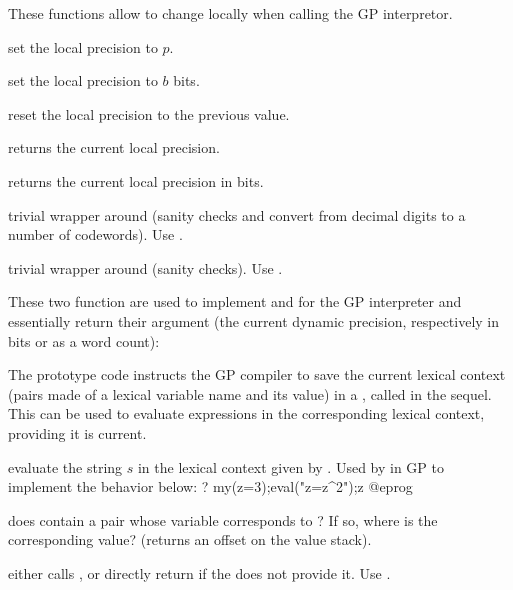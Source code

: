 These functions allow to change  locally when
calling the GP interpretor.

 set the local precision to $p$.

 set the local precision to $b$ bits.

 reset the local precision to the previous
value.

 returns the current local precision.

 returns the current local precision in bits.

 trivial wrapper around 
(sanity checks and convert from decimal digits to a number of codewords).
Use .

 trivial wrapper around 
(sanity checks). Use .

These two function are used to implement  and
 for the GP interpreter and essentially return their
argument (the current dynamic precision, respectively in bits or as a
 word count):





The prototype code  instructs the GP compiler to save the current
lexical context (pairs made of a lexical variable name and its value)
in a , called  in the sequel. This  can be used
to evaluate expressions in the corresponding lexical context, providing it is
current.

 evaluate the string $s$
in the lexical context given by .  Used by  in GP
to implement the behavior below:
\bprog
? my(z=3);eval("z=z^2");z
@eprog

 does  contain
a pair whose variable corresponds to ? If so, where is the
corresponding value? (returns an offset on the value stack).


 either calls , or directly
return  if the  does not provide it. Use .

